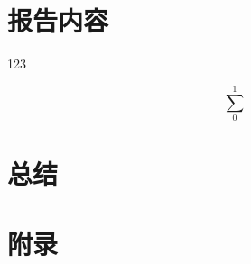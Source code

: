 \documentclass[10pt, a4paper]{article}      %
\begin{document}


\newpage
\section{报告内容} \label{ch1}               %
123\cite{G1904}                             %

\begin{equation}
    \sum_0^1                                %
\end{equation}

\newpage
\section{总结} \label{ch2}

\cite{G1904}

\newpage
{}  %

\newpage
\section{附录} \label{ch3}

\end{document}
